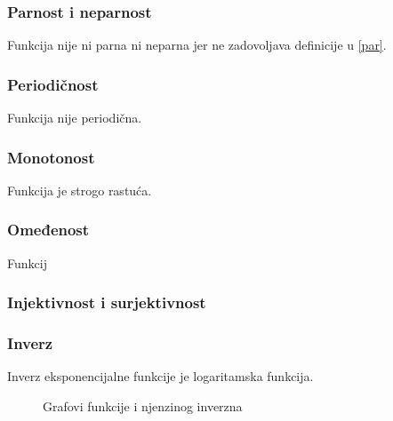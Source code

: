 \subsubsection{Parnost i neparnost \loga}
    Funkcija nije ni parna ni neparna jer ne zadovoljava definicije u \ref{par}.

\subsubsection{Periodičnost \loga}
    Funkcija nije periodična.

\subsubsection{Monotonost \loga}
    Funkcija je strogo rastuća.

\subsubsection{Omeđenost \loga}
    Funkcij
\subsubsection{Injektivnost i surjektivnost \loga}
\subsubsection{Inverz \loga}
Inverz eksponencijalne funkcije je logaritamska funkcija.
    \begin{figure}[ht]
        \centering
        \caption{Grafovi funkcije i njenzinog inverzna}
        \label{fig:template}
    \end{figure}
    \\